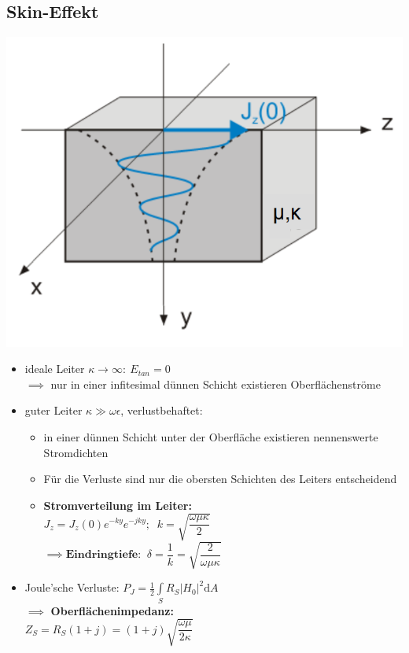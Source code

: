 \begin{multicols}{3}
	 \subsection{Skin-Effekt}%
	 \includegraphics[width=.3\paperheight]{content/fuw/pictures/skin_effect.png}
	 {\small%
	 \begin{itemize}
	 	\itemsep0pt
		\item ideale Leiter \(\kappa\to\infty:\: E_{tan} = 0\)\\
		\(\implies\) nur in einer infitesimal dünnen Schicht existieren Oberflächenströme
		\item guter Leiter \(\kappa\gg\omega\epsilon\), verlustbehaftet:
		\begin{itemize}
			\itemsep0pt
			\item in einer dünnen Schicht unter der Oberfläche existieren nennenswerte Stromdichten\\
			\item Für die Verluste sind nur die obersten Schichten des Leiters entscheidend
			\item \textbf{Stromverteilung im Leiter:}\\
			\(J_z = J_z(0)e^{-ky}e^{-jky};\;\;k=\sqrt{\dfrac{\omega\mu\kappa}{2}}\)\\
			\(\implies \mathrm{\textbf{Eindringtiefe:}}\;\; \delta = \dfrac{1}{k} = \sqrt{\dfrac{2}{\omega\mu\kappa}}\)
		\end{itemize}
		\item Joule'sche Verluste: \(P_J = \frac{1}{2}\int\limits_S R_S |H_0|^2\mathrm{d}A\)\\
		\(\implies\) \textbf{Oberflächenimpedanz:}\\
		\(Z_S = R_S (1 + j) = (1 + j)\sqrt{\dfrac{\omega\mu}{2\kappa}}\)
	 \end{itemize}
	 }


\end{multicols}
